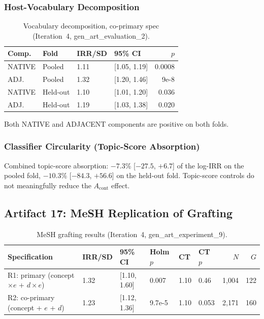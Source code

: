 \documentclass[11pt,letterpaper]{article}
\begin{document}
\subsubsection{Host-Vocabulary Decomposition}

\begin{table}[!htbp]
\centering
\caption{Vocabulary decomposition, co-primary spec (Iteration~4, gen\_art\_evaluation\_2).}
\label{tab:vocab_decomp}
{\footnotesize\setlength{\tabcolsep}{4pt}
\begin{tabular}{L{2.2cm}L{1.5cm}R{1.2cm}L{1.8cm}r}
\toprule
Comp. & Fold & IRR/SD & 95\% CI & $p$ \\
\midrule
NATIVE & Pooled & 1.11 & [1.05, 1.19] & 0.0008 \\
ADJ. & Pooled & 1.32 & [1.20, 1.46] & 9e-8 \\
NATIVE & Held-out & 1.10 & [1.01, 1.20] & 0.036 \\
ADJ. & Held-out & 1.19 & [1.03, 1.38] & 0.020 \\
\bottomrule
\end{tabular}
}
\end{table}

Both NATIVE and ADJACENT components are positive on both folds.

\subsubsection{Classifier Circularity (Topic-Score Absorption)}

Combined topic-score absorption: $-7.3$\% [$-27.5$, $+6.7$] of the log-IRR on the pooled fold, $-10.3$\% [$-84.3$, $+56.6$] on the held-out fold. Topic-score controls do not meaningfully reduce the $A_{\mathrm{cont}}$ effect.

\subsection{Artifact 17: MeSH Replication of Grafting}

\begin{table}[!htbp]
\centering
\caption{MeSH grafting results (Iteration~4, gen\_art\_experiment\_9).}
\label{tab:mesh_grafting}
{\small
\begin{tabular}{L{3.5cm}R{1.3cm}L{2.3cm}R{1.3cm}R{1cm}R{0.8cm}rr}
\toprule
Specification & IRR/SD & 95\% CI & Holm $p$ & CT & CT $p$ & $N$ & $G$ \\
\midrule
R1: primary (concept$\times e$ + $d\times e$) & 1.32 & [1.10, 1.60] & 0.007 & 1.10 & 0.46 & 1,004 & 122 \\
R2: co-primary (concept + $e$ + $d$) & 1.23 & [1.12, 1.36] & 9.7e-5 & 1.10 & 0.053 & 2,171 & 160 \\
\bottomrule
\end{tabular}
}
\end{table}
\end{document}
